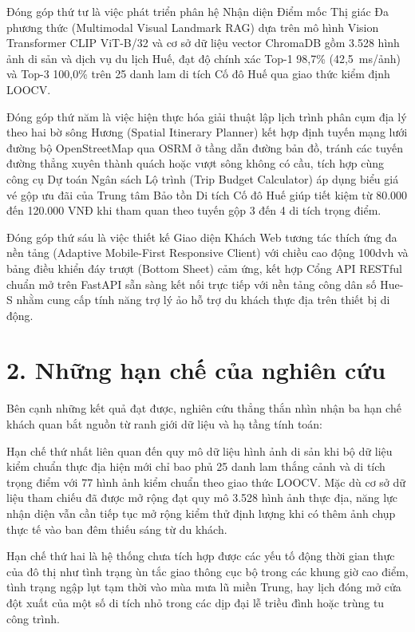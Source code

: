 Đóng góp thứ tư là việc phát triển phân hệ Nhận diện Điểm mốc Thị giác Đa phương thức (Multimodal Visual Landmark RAG) dựa trên mô hình Vision Transformer CLIP ViT-B/32 và cơ sở dữ liệu vector ChromaDB gồm 3.528 hình ảnh di sản và dịch vụ du lịch Huế, đạt độ chính xác Top-1 98,7\% (42,5~ms/ảnh) và Top-3 100,0\% trên 25 danh lam di tích Cố đô Huế qua giao thức kiểm định LOOCV.

Đóng góp thứ năm là việc hiện thực hóa giải thuật lập lịch trình phân cụm địa lý theo hai bờ sông Hương (Spatial Itinerary Planner) kết hợp định tuyến mạng lưới đường bộ OpenStreetMap qua OSRM ở tầng dẫn đường bản đồ, tránh các tuyến đường thẳng xuyên thành quách hoặc vượt sông không có cầu, tích hợp cùng công cụ Dự toán Ngân sách Lộ trình (Trip Budget Calculator) áp dụng biểu giá vé gộp ưu đãi của Trung tâm Bảo tồn Di tích Cố đô Huế giúp tiết kiệm từ 80.000 đến 120.000 VNĐ khi tham quan theo tuyến gộp 3 đến 4 di tích trọng điểm.

Đóng góp thứ sáu là việc thiết kế Giao diện Khách Web tương tác thích ứng đa nền tảng (Adaptive Mobile-First Responsive Client) với chiều cao động 100dvh và bảng điều khiển đáy trượt (Bottom Sheet) cảm ứng, kết hợp Cổng API RESTful chuẩn mở trên FastAPI sẵn sàng kết nối trực tiếp với nền tảng công dân số Hue-S nhằm cung cấp tính năng trợ lý ảo hỗ trợ du khách thực địa trên thiết bị di động.

\section*{2. Những hạn chế của nghiên cứu}
{}

Bên cạnh những kết quả đạt được, nghiên cứu thẳng thắn nhìn nhận ba hạn chế khách quan bắt nguồn từ ranh giới dữ liệu và hạ tầng tính toán:

Hạn chế thứ nhất liên quan đến quy mô dữ liệu hình ảnh di sản khi bộ dữ liệu kiểm chuẩn thực địa hiện mới chỉ bao phủ 25 danh lam thắng cảnh và di tích trọng điểm với 77 hình ảnh kiểm chuẩn theo giao thức LOOCV. Mặc dù cơ sở dữ liệu tham chiếu đã được mở rộng đạt quy mô 3.528 hình ảnh thực địa, năng lực nhận diện vẫn cần tiếp tục mở rộng kiểm thử định lượng khi có thêm ảnh chụp thực tế vào ban đêm thiếu sáng từ du khách.

Hạn chế thứ hai là hệ thống chưa tích hợp được các yếu tố động thời gian thực của đô thị như tình trạng ùn tắc giao thông cục bộ trong các khung giờ cao điểm, tình trạng ngập lụt tạm thời vào mùa mưa lũ miền Trung, hay lịch đóng mở cửa đột xuất của một số di tích nhỏ trong các dịp đại lễ triều đình hoặc trùng tu công trình.

